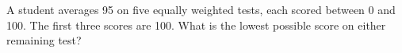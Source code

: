 A student averages 95 on five equally weighted tests, each scored between 0 and 100. The first three scores are 100. What is the lowest possible score on either remaining test?
